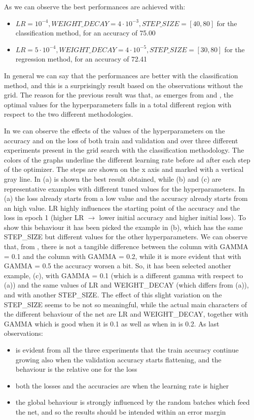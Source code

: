 \documentclass[10pt,twocolumn,hidelinks,letterpaper]{article}
\begin{document}
As we can observe the best performances are achieved with:
\begin{itemize}
  \item $LR = 10^{-4}, WEIGHT\_DECAY = 4 \cdot 10^{-3}, STEP\_SIZE = [40, 80]$ for the classification method, for an accuracy of 75.00
    \item $LR = 5 \cdot 10^{-4}, WEIGHT\_DECAY = 4 \cdot 10^{-5}, STEP\_SIZE = [30, 80]$ for the regression method, for an accuracy of 72.41
\end{itemize}

In general we can say that the performances are better with the classification method, and this is a surprisingly result based on the observations without the grid. The reason for the previous result was that, as emerges from  and , the optimal values for the hyperparameters falls in a total different region with respect to the two different methodologies.

In  we can observe the effects of the values of the hyperparameters on the accuracy and on the loss of both train and validation and over three different experiments present in the grid search with the classification methodology. The colors of the graphs underline the different learning rate before ad after each step of the optimizer. The steps are shown on the x axis and marked with a vertical gray line. In (a) is shown the best result obtained, while (b) and (c) are representative examples with different tuned values for the hyperparameters. In (a) the loss already starts from a low value and the accuracy already starts from an high value. LR highly influences the starting point of the accuracy and the loss in epoch 1 (higher LR $\rightarrow$ lower initial accuracy and higher initial loss). To show this behaviour it has been picked the example in (b), which has the same STEP\_SIZE but different values for the other hyperparameters. We can observe that, from , there is not a tangible difference between the column with GAMMA = 0.1 and the column with GAMMA = 0.2, while it is more evident that with GAMMA = 0.5 the accuracy worsen a bit. So, it has been selected another example, (c),  with GAMMA = 0.1 (which is a different gamma with respect to (a)) and the same values of LR and WEIGHT\_DECAY (which differs from (a)), and with another STEP\_SIZE. The effect of this slight variation on the STEP\_SIZE seems to be not so meaningful, while the actual main characters of the different behaviour of the net are LR and WEIGHT\_DECAY, together with GAMMA which is good when it is 0.1 as well as when in is 0.2. As last observations:
\begin{itemize}
  \item is evident from all the three experiments that the train accuracy continue growing also when the validation accuracy starts flattening, and the behaviour is the relative one for the loss
  \item both the losses and the accuracies are  when the learning rate is higher
  \item the global behaviour is strongly influenced by the random batches which feed the net, and so the results should be intended within an error margin
\end{itemize}
\end{document}
